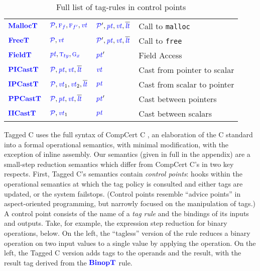\documentclass{llncs}
\begin{document}
\begin{table}[t]
\begin{tabular}{|l|l|l|l|}
    \(\color{blue} \mathbf{MallocT}\)    & \(\mathcal{\color{blue} P}, {\color{blue} \textnormal{\sc f}_{f}}, {\color{blue} \textnormal{\sc f}_{f'}}, \mathit{\color{blue} vt}\)       & \(\mathcal{\color{blue} P}',\mathit{\color{blue} pt},\mathit{\color{blue} vt},\overline{\mathit{\color{blue} lt}}\)    & Call to {\tt malloc} \\
    \(\color{blue} \mathbf{FreeT}\)      & \(\mathcal{\color{blue} P}, \mathit{\color{blue} vt}\)         & \(\mathcal{\color{blue} P}',\mathit{\color{blue} pt},\mathit{\color{blue} vt},\overline{\mathit{\color{blue} lt}}\)      & Call to {\tt free} \\
    \(\color{blue} \mathbf{FieldT}\)     & \(\mathit{\color{blue} pt}, {\color{blue} \textnormal{\sc t}_{ty}}, {\color{blue} \textnormal{\sc g}_{x}}\)        & \(\mathit{\color{blue} pt}'\)     & Field Access \\
    \(\color{blue} \mathbf{PICastT}\)    & \(\mathcal{\color{blue} P}, \mathit{\color{blue} pt}, \mathit{\color{blue} vt}, \overline{\mathit{\color{blue} lt}}\)       & \(\mathit{\color{blue} vt}\)    & Cast from pointer to scalar \\
    \(\color{blue} \mathbf{IPCastT}\)    & \(\mathcal{\color{blue} P}, \mathit{\color{blue} vt}_1, \mathit{\color{blue} vt}_2, \overline{\mathit{\color{blue} lt}}\)       & \(\mathit{\color{blue} pt}\)    & Cast from scalar to pointer \\
    \(\color{blue} \mathbf{PPCastT}\)    & \(\mathcal{\color{blue} P}, \mathit{\color{blue} pt}, \mathit{\color{blue} vt}, \overline{\mathit{\color{blue} lt}}\)       & \(\mathit{\color{blue} pt}'\)    & Cast between pointers \\
    \(\color{blue} \mathbf{IICastT}\)    & \(\mathcal{\color{blue} P}, \mathit{\color{blue} vt}_1\)       & \(\mathit{\color{blue} pt}\)    & Cast between scalars \\
    \hline
  \end{tabular}

  \caption{Full list of tag-rules in control points}
  \label{fig:controlpoints}
\end{table}

Tagged C uses the full syntax of CompCert C \cite{Leroy09:CompCert},
an elaboration of the C standard into a formal operational semantics,
with minimal modification, with the exception of inline assembly.
Our semantics (given in full in the appendix) are a small-step reduction
semantics which differ from CompCert C's in two key respects. First, Tagged C's semantics contain
{\em control points}: hooks within the
operational semantics at which the tag policy is consulted and either tags are updated, or the system
failstops. (Control points resemble ``advice points'' in aspect-oriented programming, but narrowly
focused on the manipulation of tags.) A control point consists of the name of a {\em tag rule}
and the bindings of its inputs and outputs. Take, for example, the expression step reduction
for binary operations, below. On the left, the ``tagless'' version of the rule reduces a
binary operation on two input values to a single value by applying the operation.
On the left, the Tagged C version adds tags to the operands and the result, with the result tag
derived from the \(\color{blue} \mathbf{BinopT}\) rule.

\begin{minipage}[t]{0.37\textwidth}
  \binopsteptagless
\end{minipage}
\begin{minipage}[t]{0.6\textwidth}
  \binopstep
\end{minipage}
\end{document}

